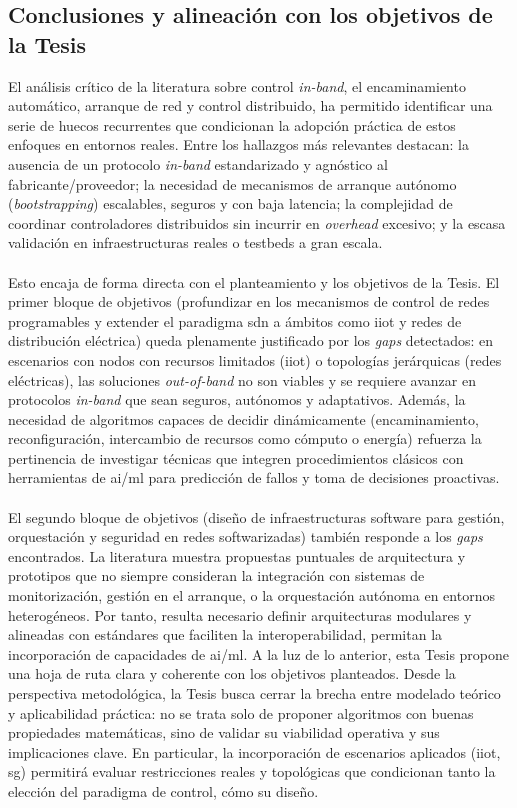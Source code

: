 \subsection{Conclusiones y alineación con los objetivos de la Tesis}

El análisis crítico de la literatura sobre control \textit{in-band}, el encaminamiento automático, arranque de red y control distribuido, ha permitido identificar una serie de huecos recurrentes que condicionan la adopción práctica de estos enfoques en entornos reales. Entre los hallazgos más relevantes destacan: la ausencia de un protocolo \textit{in-band} estandarizado y agnóstico al fabricante/proveedor; la necesidad de mecanismos de arranque autónomo (\emph{bootstrapping}) escalables, seguros y con baja latencia; la complejidad de coordinar controladores distribuidos sin incurrir en \textit{overhead} excesivo; y la escasa validación en infraestructuras reales o testbeds a gran escala.\\
\\
Esto encaja de forma directa con el planteamiento y los objetivos de la Tesis. El primer bloque de objetivos (profundizar en los mecanismos de control de redes programables y extender el paradigma \gls{sdn} a ámbitos como \gls{iiot} y redes de distribución eléctrica) queda plenamente justificado por los \textit{gaps} detectados: en escenarios con nodos con recursos limitados (\gls{iiot}) o topologías jerárquicas (redes eléctricas), las soluciones \textit{out-of-band} no son viables y se requiere avanzar en protocolos \textit{in-band} que sean seguros, autónomos y adaptativos. Además, la necesidad de algoritmos capaces de decidir dinámicamente (encaminamiento, reconfiguración, intercambio de recursos como cómputo o energía) refuerza la pertinencia de investigar técnicas que integren procedimientos clásicos con herramientas de \gls{ai}/\gls{ml} para predicción de fallos y toma de decisiones proactivas.\\
\\
El segundo bloque de objetivos (diseño de infraestructuras software para gestión, orquestación y seguridad en redes softwarizadas) también responde a los \textit{gaps} encontrados. La literatura muestra propuestas puntuales de arquitectura y prototipos que no siempre consideran la integración con sistemas de monitorización, gestión en el arranque, o la orquestación autónoma en entornos heterogéneos. Por tanto, resulta necesario definir arquitecturas modulares y alineadas con estándares que faciliten la interoperabilidad, permitan la incorporación de capacidades de \gls{ai}/\gls{ml}. A la luz de lo anterior, esta Tesis propone una hoja de ruta clara y coherente con los objetivos planteados. Desde la perspectiva metodológica, la Tesis busca cerrar la brecha entre modelado teórico y aplicabilidad práctica: no se trata solo de proponer algoritmos con buenas propiedades matemáticas, sino de validar su viabilidad operativa y sus implicaciones clave. En particular, la incorporación de escenarios aplicados (\gls{iiot}, \gls{sg}) permitirá evaluar restricciones reales y topológicas que condicionan tanto la elección del paradigma de control, cómo su diseño.


